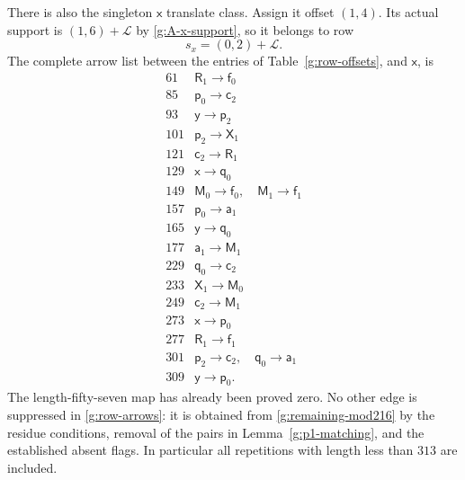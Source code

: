 \documentclass[11pt]{article}
\theoremstyle{definition}
\theoremstyle{remark}
\numberwithin{equation}{section}
\begin{document}
There is also the singleton $\mathsf x$ translate class.
Assign it offset $(1,4)$.  Its actual support is
$(1,6)+\mathcal L$ by \eqref{g:A-x-support}, so it
belongs to row
\begin{equation}\label{g:x-row}
 s_x=(0,2)+\mathcal L.
\end{equation}
The complete arrow list between the entries of
Table~\ref{g:row-offsets}, and $\mathsf x$, is
\begin{equation}\label{g:row-arrows}
\begin{array}{c|l}
61&\mathsf R_1\longrightarrow\mathsf f_0\\
85&\mathsf p_0\longrightarrow\mathsf c_2\\
93&\mathsf y\longrightarrow\mathsf p_2\\
101&\mathsf p_2\longrightarrow\mathsf X_1\\
121&\mathsf c_2\longrightarrow\mathsf R_1\\
129&\mathsf x\longrightarrow\mathsf q_0\\
149&\mathsf M_0\longrightarrow\mathsf f_0,\quad
     \mathsf M_1\longrightarrow\mathsf f_1\\
157&\mathsf p_0\longrightarrow\mathsf a_1\\
165&\mathsf y\longrightarrow\mathsf q_0\\
177&\mathsf a_1\longrightarrow\mathsf M_1\\
229&\mathsf q_0\longrightarrow\mathsf c_2\\
233&\mathsf X_1\longrightarrow\mathsf M_0\\
249&\mathsf c_2\longrightarrow\mathsf M_1\\
273&\mathsf x\longrightarrow\mathsf p_0\\
277&\mathsf R_1\longrightarrow\mathsf f_1\\
301&\mathsf p_2\longrightarrow\mathsf c_2,\quad
     \mathsf q_0\longrightarrow\mathsf a_1\\
309&\mathsf y\longrightarrow\mathsf p_0.
\end{array}
\end{equation}
The length-fifty-seven map has already been proved zero.
No other edge is suppressed in \eqref{g:row-arrows}:
it is obtained from \eqref{g:remaining-mod216} by the
residue conditions, removal of the pairs in
Lemma~\ref{g:p1-matching}, and the established absent
flags.  In particular all repetitions with length
less than $313$ are included.
\end{document}
